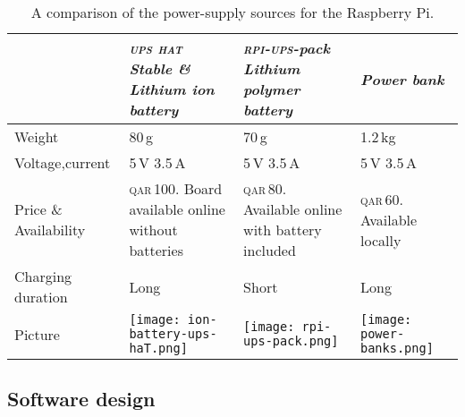 \documentclass[../main.tex]{subfiles}
\begin{document}
\begin{table}[tbp]
	\centering
	\caption{A comparison of the power-supply sources for the
        Raspberry Pi.}
	\label{tab:power-sources}  
	\begin{tabular}{ L{3cm} L{4cm} L{4cm} L{4cm} }
            \toprule

            \textit{} & \textit{\textsc{ups hat} Stable \& Lithium
            ion battery} & 
            \textit{\textsc{rpi-ups}-pack Lithium polymer battery}
            & \textit{Power bank}\\ 

            \midrule

            Weight & 80\,g & 70\,g & 1.2\,kg 
            \\ \addlinespace

            Voltage,current & 5\,V 3.5\,A  & 5\,V 3.5\,A &  5\,V 3.5\,A
            \\ \addlinespace
				
            Price \& Availability 
            & \textsc{qar}\,100. Board available online without
            batteries 
            & \textsc{qar}\,80. Available online with battery included 
            & \textsc{qar}\,60. Available locally 
            \\ \addlinespace

            Charging duration & Long & Short & Long 
            \\ \addlinespace	

            Picture & 
            \begin{minipage}{.2\textwidth}
                \texttt{[image: ion-battery-ups-haT.png]}
            \end{minipage}  & 
            \begin{minipage}{.2\textwidth}
                \texttt{[image: rpi-ups-pack.png]}
            \end{minipage} & 
            \begin{minipage}{.2\textwidth}
                \texttt{[image: power-banks.png]}
            \end{minipage} 
            \\

            \bottomrule
        \end{tabular}
\end{table}

\subsection{Software design}
\end{document}
